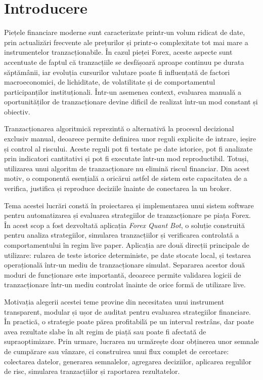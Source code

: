 \chapter{Introducere}
\label{cap:cap1}

Piețele financiare moderne sunt caracterizate printr-un volum ridicat de date, prin actualizări frecvente ale prețurilor și printr-o complexitate tot mai mare a instrumentelor tranzacționabile. În cazul pieței Forex, aceste aspecte sunt accentuate de faptul că tranzacțiile se desfășoară aproape continuu pe durata săptămânii, iar evoluția cursurilor valutare poate fi influențată de factori macroeconomici, de lichiditate, de volatilitate și de comportamentul participanților instituționali. Într-un asemenea context, evaluarea manuală a oportunităților de tranzacționare devine dificil de realizat într-un mod constant și obiectiv.

Tranzacționarea algoritmică reprezintă o alternativă la procesul decizional exclusiv manual, deoarece permite definirea unor reguli explicite de intrare, ieșire și control al riscului. Aceste reguli pot fi testate pe date istorice, pot fi analizate prin indicatori cantitativi și pot fi executate într-un mod reproductibil. Totuși, utilizarea unui algoritm de tranzacționare nu elimină riscul financiar. Din acest motiv, o componentă esențială a oricărui astfel de sistem este capacitatea de a verifica, justifica și reproduce deciziile înainte de conectarea la un broker.

Tema acestei lucrări constă în proiectarea și implementarea unui sistem software pentru automatizarea și evaluarea strategiilor de tranzacționare pe piața Forex. În acest scop a fost dezvoltată aplicația \textit{Forex Quant Bot}, o soluție construită pentru analiza strategiilor, simularea tranzacțiilor și verificarea controlată a comportamentului în regim live paper. Aplicația are două direcții principale de utilizare: rularea de teste istorice deterministe, pe date stocate local, și testarea operațională într-un mediu de tranzacționare simulat. Separarea acestor două moduri de funcționare este importantă, deoarece permite validarea logicii de tranzacționare într-un mediu controlat înainte de orice formă de utilizare live.

Motivația alegerii acestei teme provine din necesitatea unui instrument transparent, modular și ușor de auditat pentru evaluarea strategiilor financiare. În practică, o strategie poate părea profitabilă pe un interval restrâns, dar poate avea rezultate slabe în alt regim de piață sau poate fi afectată de supraoptimizare. Prin urmare, lucrarea nu urmărește doar obținerea unor semnale de cumpărare sau vânzare, ci construirea unui flux complet de cercetare: colectarea datelor, generarea semnalelor, agregarea deciziilor, aplicarea regulilor de risc, simularea tranzacțiilor și raportarea rezultatelor.

